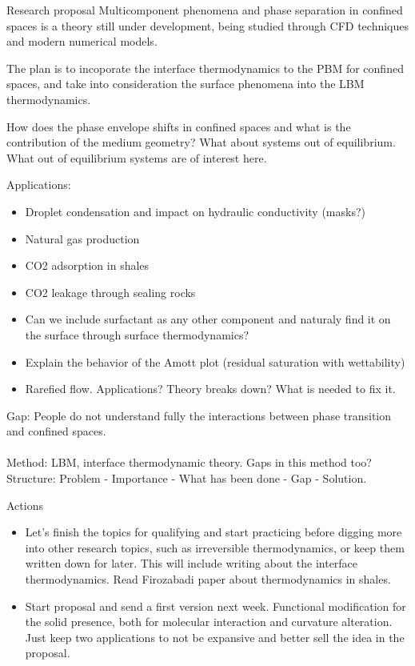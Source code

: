 \documentclass[8pt]{beamer}
\begin{document}
	\begin{frame}[t]{Research proposal}
		Multicomponent phenomena and phase separation in confined spaces is a theory still under development, being studied through CFD techniques and modern numerical models. 
		
		The plan is to incoporate the interface thermodynamics to the PBM for confined spaces, and take into consideration the surface phenomena into the LBM thermodynamics. 
		
		How does the phase envelope shifts in confined spaces and what is the contribution of the medium geometry? What about systems out of equilibrium. What out of equilibrium systems are of interest here.
		
		Applications:
		\begin{itemize}
			\item Droplet condensation and impact on hydraulic conductivity (masks?)
			\item Natural gas production 
			\item CO2 adsorption in shales
			\item CO2 leakage through sealing rocks
			\item Can we include surfactant as any other component and naturaly find it on the surface through surface thermodynamics?
			\item Explain the behavior of the Amott plot (residual saturation with wettability)
			\item Rarefied flow. Applications? Theory breaks down? What is needed to fix it. 
		\end{itemize}
	
	Gap: People do not understand fully the interactions between phase transition and confined spaces.\\~\\
	Method: LBM, interface thermodynamic theory. Gaps in this method too?\\
	Structure: Problem - Importance - What has been done - Gap - Solution.
	\end{frame}
	
	\begin{frame}{Actions}
		\begin{itemize}
			\item Let's finish the topics for qualifying and start practicing before digging more into other research topics, such as irreversible thermodynamics, or keep them written down for later. This will include writing about the interface thermodynamics. Read Firozabadi paper about thermodynamics in shales.
			\item Start proposal and send a first version next week. Functional modification for the solid presence, both for molecular interaction and curvature alteration. Just keep two applications to not be expansive and better sell the idea in the proposal.
		\end{itemize}
	\end{frame}
	
\end{document}
